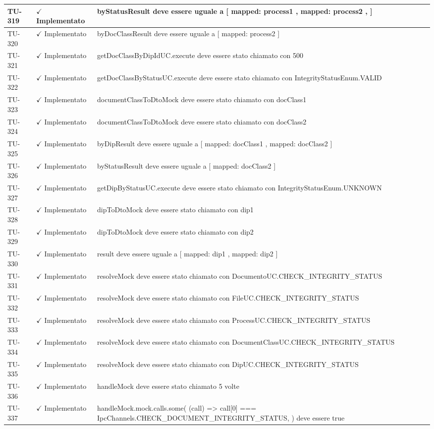 ﻿\documentclass[a4paper,12pt]{article}
\newcommand{\ok}{\textcolor{green!60!black}{$\checkmark$ Implementato}}
\begin{document}
\begin{longtable}{|p{2cm}|p{3.5cm}|p{9.5cm}|}
\hline
TU-319 & \ok & byStatusResult deve essere uguale a [ { mapped: process1 }, { mapped: process2 }, ] \\
\hline
TU-320 & \ok & byDocClassResult deve essere uguale a [{ mapped: process2 }] \\
\hline
TU-321 & \ok & getDocClassByDipIdUC.execute deve essere stato chiamato con 500 \\
\hline
TU-322 & \ok & getDocClassByStatusUC.execute deve essere stato chiamato con IntegrityStatusEnum.VALID \\
\hline
TU-323 & \ok & documentClassToDtoMock deve essere stato chiamato con docClass1 \\
\hline
TU-324 & \ok & documentClassToDtoMock deve essere stato chiamato con docClass2 \\
\hline
TU-325 & \ok & byDipResult deve essere uguale a [{ mapped: docClass1 }, { mapped: docClass2 }] \\
\hline
TU-326 & \ok & byStatusResult deve essere uguale a [{ mapped: docClass2 }] \\
\hline
TU-327 & \ok & getDipByStatusUC.execute deve essere stato chiamato con IntegrityStatusEnum.UNKNOWN \\
\hline
TU-328 & \ok & dipToDtoMock deve essere stato chiamato con dip1 \\
\hline
TU-329 & \ok & dipToDtoMock deve essere stato chiamato con dip2 \\
\hline
TU-330 & \ok & result deve essere uguale a [{ mapped: dip1 }, { mapped: dip2 }] \\
\hline
TU-331 & \ok & resolveMock deve essere stato chiamato con DocumentoUC.CHECK\_INTEGRITY\_STATUS \\
\hline
TU-332 & \ok & resolveMock deve essere stato chiamato con FileUC.CHECK\_INTEGRITY\_STATUS \\
\hline
TU-333 & \ok & resolveMock deve essere stato chiamato con ProcessUC.CHECK\_INTEGRITY\_STATUS \\
\hline
TU-334 & \ok & resolveMock deve essere stato chiamato con DocumentClassUC.CHECK\_INTEGRITY\_STATUS \\
\hline
TU-335 & \ok & resolveMock deve essere stato chiamato con DipUC.CHECK\_INTEGRITY\_STATUS \\
\hline
TU-336 & \ok & handleMock deve essere stato chiamato 5 volte \\
\hline
TU-337 & \ok & handleMock.mock.calls.some( (call) => call[0] === IpcChannels.CHECK\_DOCUMENT\_INTEGRITY\_STATUS, ) deve essere true \\

\end{longtable}
\end{document}
